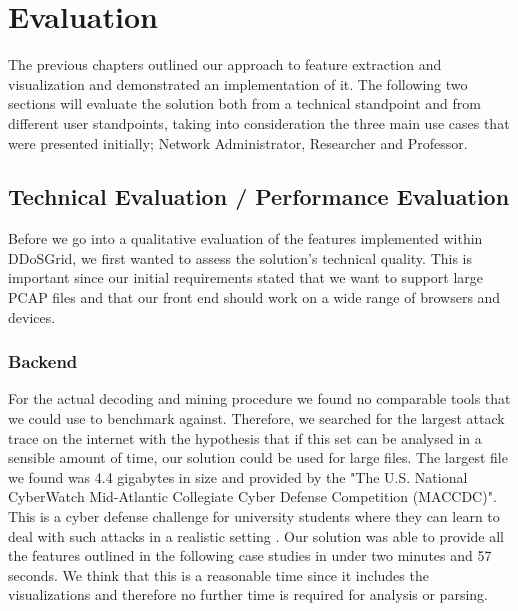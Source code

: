 




\chapter{Evaluation}

The previous chapters outlined our approach to feature extraction and visualization and demonstrated an implementation of it. The following two sections will evaluate the solution both from a technical standpoint and from different user standpoints, taking into consideration the three main use cases that were presented initially; Network Administrator, Researcher and Professor.
\section{Technical Evaluation / Performance Evaluation}
Before we go into a qualitative evaluation of the features implemented within DDoSGrid, we first wanted to assess the solution's technical quality. This is important since our initial requirements stated that we want to support large PCAP files and that our front end should work on a wide range of browsers and devices.
\subsection{Backend}
For the actual decoding and mining procedure we found no comparable tools that we could use to benchmark against. Therefore, we searched for the largest attack trace on the internet with the hypothesis that if this set can be analysed in a sensible amount of time, our solution could be used for large files. The largest file we found was 4.4 gigabytes in size and provided by the "The U.S. National CyberWatch Mid-Atlantic Collegiate Cyber Defense Competition (MACCDC)". This is a cyber defense challenge for university students where they can learn to deal with such attacks in a realistic setting \cite{maccdc}.
Our solution was able to provide all the features outlined in the following case studies in under two minutes and 57 seconds. We think that this is a reasonable time since it includes the visualizations and therefore no further time is required for analysis or parsing.
